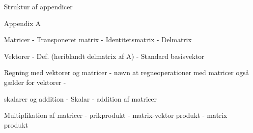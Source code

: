 Struktur af appendicer

Appendix A

Matricer
- Transponeret matrix
- Identitetsmatrix
- Delmatrix

Vektorer
- Def. (heriblandt delmatrix af A)
- Standard basisvektor

Regning med vektorer og matricer
- nævn at regneoperationer med matricer også gælder for vektorer
- 

skalarer og addition
- Skalar
- addition af matricer

Multiplikation af matricer
- prikprodukt
- matrix-vektor produkt
- matrix produkt

